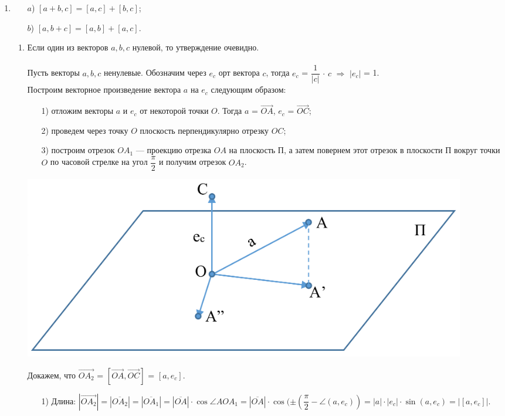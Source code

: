 \begin{enumerate}
\begin{Proof}
	\end{Proof}
	\item \begin{enumerate}
		\item[$a$)] $[a + b, c] = [a, c] + [b, c]$;
		\item[$b$)] $[a, b + c] = [a, b] + [a, c]$.
	\end{enumerate}
	\begin{Proof} \begin{enumerate}
			\item Если один из векторов $a, b, c$ нулевой, то утверждение очевидно.\\\\
			Пусть векторы $a, b, c$ ненулевые. Обозначим через $e_c$ орт вектора $c$, тогда $e_c$ = $\dfrac{1}{|c|}$ $\cdot$ $c$ $\Rightarrow$ $|e_c|$ = 1. \\
			Построим векторное произведение вектора $a$ на $e_c$ следующим образом:
			\begin{enumerate}
				\item [1)]отложим векторы $a$ и $e_c$ от некоторой точки $O$. Тогда $a$ = $\overrightarrow{OA}$, $e_c$ = $\overrightarrow{OC}$; 
				\item [2)] проведем через точку $O$ плоскость перпендикулярно отрезку $OC$;
				\item [3)] построим отрезок $O A_1$ --- проекцию отрезка $OA$ на плоскость П, а затем повернем этот отрезок в плоскости П вокруг точки $O$ по часовой стрелке на угол $\dfrac{\pi}{2}$ и получим отрезок $O A_2$.
			\end{enumerate}\begin{center}
				\includegraphics[scale=0.4]{images/pl_3_5.png}
			\end{center}
			Докажем, что $\overrightarrow{O A_2}$ = $[\overrightarrow{OA}, \overrightarrow{OC}]$ = $[a, e_c]$.
			\begin{enumerate}
				\item [1)] Длина: $|\overrightarrow{O A_2}| = |\overline{O A_2}| = |\overline{O A_1}| = |\overline{OA}|\cdot \cos \angle AO A_1 = |\overline{OA}| \cdot \cos (\pm (\dfrac{\pi}{2} - \angle(a, e_c)) = |a|\cdot|e_c|\cdot \sin (a, e_c) = |[a, e_c]|$.\\

\end{enumerate}
\end{enumerate}
\end{Proof}
\end{enumerate}
